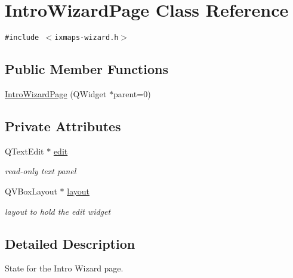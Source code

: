 \hypertarget{classIntroWizardPage}{
\section{IntroWizardPage Class Reference}
\label{classIntroWizardPage}
}
{\tt \#include $<$ixmaps-wizard.h$>$}

\subsection*{Public Member Functions}
\begin{CompactItemize}
\item 
\hyperlink{classIntroWizardPage_0c8c54c63208431330f6f24e46e09435}{IntroWizardPage} (QWidget $\ast$parent=0)
\end{CompactItemize}
\subsection*{Private Attributes}
\begin{CompactItemize}
\item 
\hypertarget{classIntroWizardPage_a44ee18dfefe831c7c64fdfc6469e25f}{
QTextEdit $\ast$ \hyperlink{classIntroWizardPage_a44ee18dfefe831c7c64fdfc6469e25f}{edit}}
\label{classIntroWizardPage_a44ee18dfefe831c7c64fdfc6469e25f}

\begin{CompactList}\small\item\em read-only text panel \item\end{CompactList}\item 
\hypertarget{classIntroWizardPage_b0407a0665b149cb27dd5f6cb9ecb6b4}{
QVBoxLayout $\ast$ \hyperlink{classIntroWizardPage_b0407a0665b149cb27dd5f6cb9ecb6b4}{layout}}
\label{classIntroWizardPage_b0407a0665b149cb27dd5f6cb9ecb6b4}

\begin{CompactList}\small\item\em layout to hold the edit widget \item\end{CompactList}\end{CompactItemize}


\subsection{Detailed Description}
State for the Intro Wizard page. 

